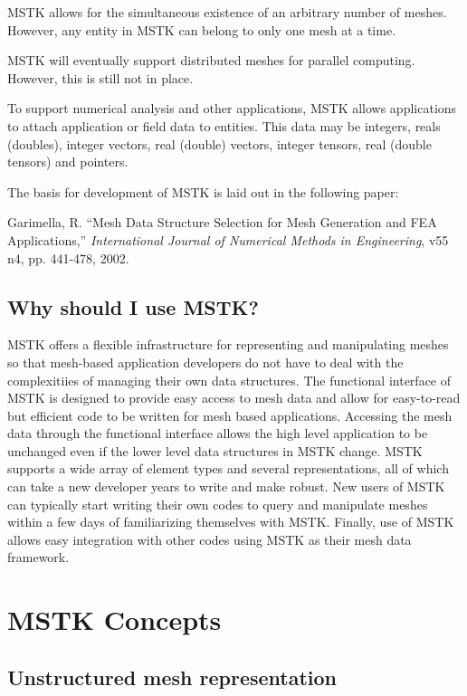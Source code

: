 \documentclass[12pt]{article}
\begin{document}
\par MSTK allows for the simultaneous existence of an arbitrary number of
meshes. However, any entity in MSTK can belong to only one mesh at a
time.

\par MSTK will eventually support distributed meshes for parallel
computing. However, this is still not in place.

\par To support numerical analysis and other applications, MSTK allows
applications to attach application or field data to entities. This
data may be integers, reals (doubles), integer vectors, real (double)
vectors, integer tensors, real (double tensors) and pointers.

\par The basis for development of MSTK is laid out in the following paper:

Garimella, R. ``Mesh Data Structure Selection for Mesh Generation and
FEA Applications,'' {\em International Journal of Numerical Methods
  in Engineering}, v55 n4, pp. 441-478, 2002.


\subsection{Why should I use MSTK?}

MSTK offers a flexible infrastructure for representing and
manipulating meshes so that mesh-based application developers do not
have to deal with the complexitiies of managing their own data
structures. The functional interface of MSTK is designed to provide
easy access to mesh data and allow for easy-to-read but efficient code
to be written for mesh based applications. Accessing the mesh data
through the functional interface allows the high level application to
be unchanged even if the lower level data structures in MSTK
change. MSTK supports a wide array of element types and several
representations, all of which can take a new developer years to write
and make robust. New users of MSTK can typically start writing their
own codes to query and manipulate meshes within a few days of
familiarizing themselves with MSTK. Finally, use of MSTK allows easy
integration with other codes using MSTK as their mesh data framework.


\section{MSTK Concepts}
\subsection{Unstructured mesh representation}
\end{document}
